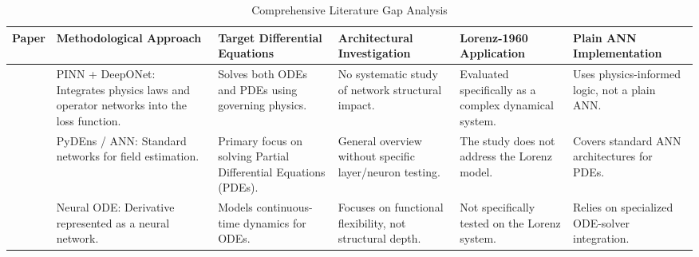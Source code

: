 \vspace{-1em} %

\begin{table}[!ht] %
    \centering
    \caption{Comprehensive Literature Gap Analysis}
    \label{tab:gap_analysis_updated}
    \tiny %
    \renewcommand{\arraystretch}{1.0} 
    \setlength{\tabcolsep}{2pt} %
    
    \begin{tabularx}{\textwidth}{| 
        >{\hsize=0.6\hsize\raggedright\arraybackslash}X | 
        >{\hsize=1.15\hsize\raggedright\arraybackslash}X | 
        >{\hsize=1.15\hsize\raggedright\arraybackslash}X | 
        >{\hsize=1.05\hsize\raggedright\arraybackslash}X | 
        >{\hsize=1.05\hsize\raggedright\arraybackslash}X | 
        >{\hsize=1.0\hsize\raggedright\arraybackslash}X |
        }
        \hline
        \textbf{Paper} & \textbf{Methodological Approach} & \textbf{Target Differential Equations} & \textbf{Architectural Investigation} & \textbf{Lorenz-1960 Application} & \textbf{Plain ANN Implementation} \\
        \hline
        
        \cite{matthews2024pinnde} & PINN + DeepONet: Integrates physics laws and operator networks into the loss function. & Solves both ODEs and PDEs using governing physics. & No systematic study of network structural impact. & Evaluated specifically as a complex dynamical system. & Uses physics-informed logic, not a plain ANN. \\
        \hline
        
        \cite{pratama2022ann} & PyDEns / ANN: Standard networks for field estimation. & Primary focus on solving Partial Differential Equations (PDEs). & General overview without specific layer/neuron testing. & The study does not address the Lorenz model. & Covers standard ANN architectures for PDEs. \\
        \hline
        
        \cite{chen2018neural} & Neural ODE: Derivative represented as a neural network. & Models continuous-time dynamics for ODEs. & Focuses on functional flexibility, not structural depth. & Not specifically tested on the Lorenz system. & Relies on specialized ODE-solver integration. \\
        \hline
        

\end{tabularx}
\end{table}
